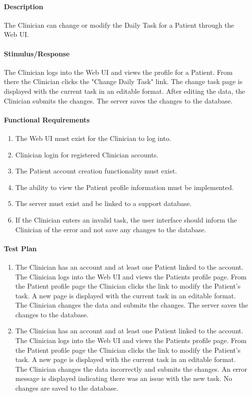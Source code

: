 \documentclass{article}
\begin{document}
\paragraph{Description}
The Clinician can change or modify the Daily Task for a Patient through the Web UI.

\paragraph{Stimulus/Response}
The Clinician logs into the Web UI and views the profile for a Patient. From there the Clinician clicks the "Change Daily Task" link.  The change task page is displayed with the current task in an editable format. After editing the data, the Clinician submits the changes.  The server saves the changes to the database.

\paragraph{Functional Requirements}
\begin{enumerate}
\item The Web UI must exist for the Clinician to log into.
\item Clinician login for registered Clinician accounts.
\item The Patient account creation functionality must exist.
\item The ability to view the Patient profile information must be implemented.
\item The server must exist and be linked to a support database.
\item If the Clinician enters an invalid task, the user interface should inform the Clinician of the error and not save any changes to the database.
\end{enumerate}

\paragraph{Test Plan}
\begin{enumerate}
\item The Clinician has an account and at least one Patient linked to the account. The Clinician logs into the Web UI and views the Patients profile page. From the Patient profile page the Clinician clicks the link to modify the Patient's task.  A new page is displayed with the current task in an editable format. The Clinician changes the data and submits the changes. The server saves the changes to the database.
\item The Clinician has an account and at least one Patient linked to the account. The Clinician logs into the Web UI and views the Patients profile page. From the Patient profile page the Clinician clicks the link to modify the Patient's task.  A new page is displayed with the current task in an editable format. The Clinician changes the data incorrectly and submits the changes. An error message is displayed indicating there was an issue with the new task. No changes are saved to the database.
\end{enumerate}
\end{document}
